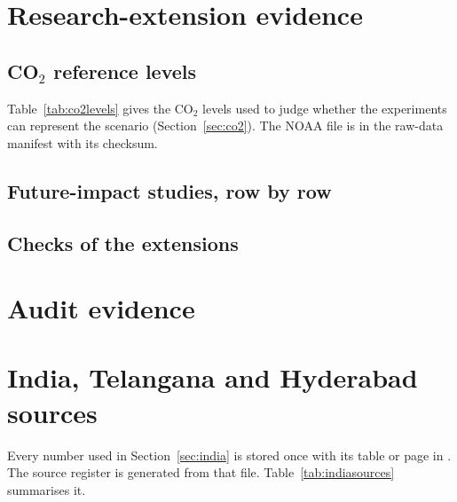 \clearpage
\section{Research-extension evidence}\label{app:ext}
\subsection{CO$_2$ reference levels}
Table~\ref{tab:co2levels} gives the CO$_2$ levels used to judge whether the experiments can represent the scenario
(Section~\ref{sec:co2}). The NOAA file is in the raw-data manifest with its checksum.

\begin{table}[H]\centering\scriptsize
\caption{CO$_2$ reference levels with sources ().}\label{tab:co2levels}
\end{table}

\subsection{Future-impact studies, row by row}
{\scriptsize\setlength{\tabcolsep}{3pt}
}

\subsection{Checks of the extensions}
{\small
}

\clearpage
\section{Audit evidence}\label{app:audit}




\section{India, Telangana and Hyderabad sources}\label{app:indiasources}
Every number used in Section~\ref{sec:india} is stored once with its table or page in
. The source register  is
generated from that file. Table~\ref{tab:indiasources} summarises it.


